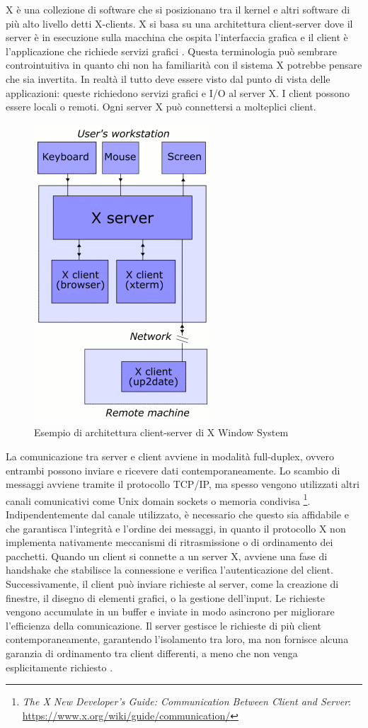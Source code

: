 \documentclass[12pt,a4paper,openright,twoside]{book}
\begin{document}
X è una collezione di software che si posizionano tra il kernel e altri software di più alto livello detti X-clients.
X si basa su una architettura client-server dove il server è in esecuzione sulla macchina che ospita l'interfaccia grafica e il client è l'applicazione che richiede servizi grafici \cite{Scheifler1986}.
%
Questa terminologia può sembrare controintuitiva in quanto chi non ha familiarità con il sistema X potrebbe pensare che sia invertita.
In realtà il tutto deve essere visto dal punto di vista delle applicazioni: queste richiedono servizi grafici e I/O al server X.
I client possono essere locali o remoti. Ogni server X può connettersi a molteplici client.
\begin{figure}
    \centering
    \includegraphics[width=.3\linewidth]{figures/X_client_server_example.png}
    \caption[xarch]{Esempio di architettura client-server di X Window System \footnotemark}
\end{figure}

La comunicazione tra server e client avviene in modalità full-duplex,
ovvero entrambi possono inviare e ricevere dati contemporaneamente.
%
Lo scambio di messaggi avviene tramite il protocollo TCP/IP,
ma spesso vengono utilizzati altri canali comunicativi come Unix domain sockets o memoria condivisa \footnote{\emph{The X New Developer’s Guide: Communication Between Client and Server}: \url{https://www.x.org/wiki/guide/communication/}}.
%
Indipendentemente dal canale utilizzato, è necessario che questo sia affidabile e che garantisca l'integrità e l'ordine dei messaggi,
in quanto il protocollo X non implementa nativamente meccanismi di ritrasmissione o di ordinamento dei pacchetti.
%
Quando un client si connette a un server X, avviene una fase di handshake che stabilisce la connessione e verifica l'autenticazione del client. Successivamente, il client può inviare richieste al server, come la creazione di finestre, il disegno di elementi grafici, o la gestione dell'input. Le richieste vengono accumulate in un buffer e inviate in modo asincrono per migliorare l'efficienza della comunicazione. Il server gestisce le richieste di più client contemporaneamente, garantendo l'isolamento tra loro, ma non fornisce alcuna garanzia di ordinamento tra client differenti, a meno che non venga esplicitamente richiesto \cite{xDevGuide}.
\end{document}
